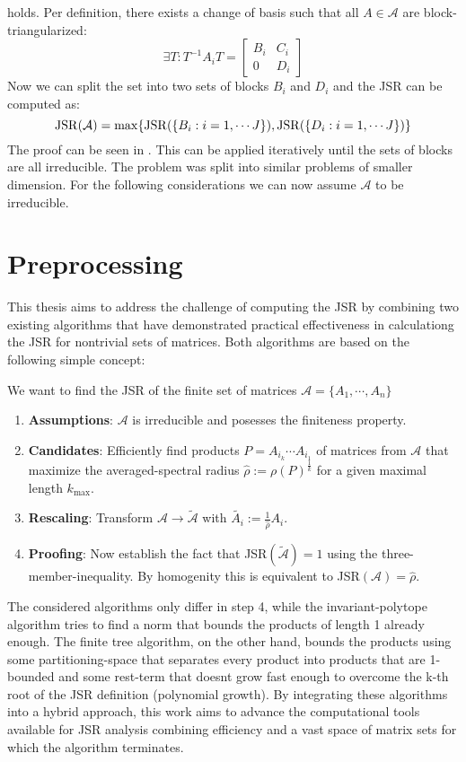 holds. Per definition, there exists a change of basis such that all $A \in \mathcal{A}$ are block-triangularized: 
$$\exists T: T^{-1}A_{i}T = 
\begin{bmatrix}
B_i & C_i  \\
0 & D_i
\end{bmatrix}
$$
Now we can split the set into two sets of blocks $B_i$ and $D_i$ and the JSR can be computed as:
\begin{equation}
    \operatorname{JSR}(\mathcal{A}) = \max\{\operatorname{JSR}(\{B_i: i = 1, \cdots J \}), \operatorname{JSR}(\{D_i: i = 1, \cdots J \})\}
\end{equation}
The proof can be seen in \citep{jungersJointSpectralRadius2009}.
This can be applied iteratively until the sets of blocks are all irreducible.
The problem was split into similar problems of smaller dimension.
For the following considerations we can now assume $\mathcal{A}$ to be irreducible.

\section{Preprocessing}
\label{sec:preprocessing}
This thesis aims to address the challenge of computing the JSR by combining two existing algorithms that have demonstrated practical effectiveness in calculationg the JSR for nontrivial sets of matrices. Both algorithms are based on the following simple concept:

We want to find the JSR of the finite set of matrices $\mathcal{A} = \{A_1, \cdots, A_n\}$
\begin{enumerate}
    \item \textbf{Assumptions}: $\mathcal{A}$ is irreducible and posesses the finiteness property. 
    \item \textbf{Candidates}: Efficiently find products $P = A_{i_k} \cdots A_{i_1}$ of matrices from $\mathcal{A}$ that maximize the averaged-spectral radius $\hat{\rho} := \rho(P)^\frac{1}{k}$ for a given maximal length $k_{\text{max}}$.
    \item \textbf{Rescaling}: Transform $\mathcal{A} \to \tilde{\mathcal{A}}$ with $\tilde{A_i} := \frac{1}{\hat{\rho}} A_i$.
    \item \textbf{Proofing}: Now establish the fact that JSR$(\tilde{\mathcal{A}}) = 1$ using the three-member-inequality. By homogenity this is equivalent to JSR$(\mathcal{A}) = \hat{\rho}$.
\end{enumerate}

The considered algorithms only differ in step 4, while the invariant-polytope algorithm tries to find a norm that bounds the products of length 1 already enough. The finite tree algorithm, on the other hand, bounds the products using some partitioning-space that separates every product into products that are 1-bounded and some rest-term that doesnt grow fast enough to overcome the k-th root of the JSR definition (polynomial growth).
By integrating these algorithms into a hybrid approach, this work aims to advance the computational tools available for JSR analysis combining efficiency and a vast space of matrix sets for which the algorithm terminates.
